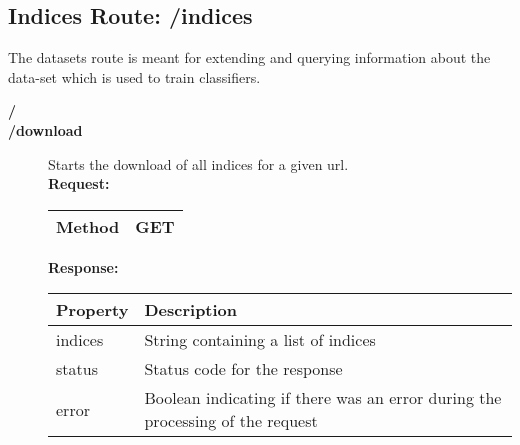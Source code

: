 \subsection{Indices Route: /indices}
The datasets route is meant for extending and querying information about the data-set which is used to train classifiers. 

\begin{description}


\item [{\large \textbf{/}}]
\item [{\large \textbf{/download}}]
Starts the download of all indices for a given url.\\
\newline
\newline
\textbf{Request:}
\newline
\newline
\begin{tabular}{ | l | l |}
\hline
Method & GET\\ \hline
\end{tabular}
\newline
\newline
\textbf{Response:}
\newline
\newline
\resizebox{\textwidth}{!} {
\begin{tabular}{ | l | l |}
\hline
\textbf{Property} & \textbf{Description}\\ \hline
indices & String containing a list of indices\\ \hline
status & Status code for the response\\ \hline
error & Boolean indicating if there was an error during the processing of the request\\ \hline
\end{tabular}}

\end{description}